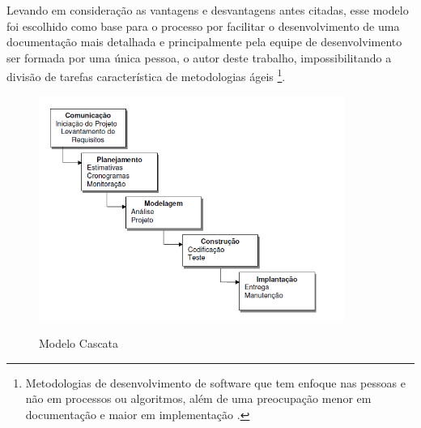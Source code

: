 Levando em consideração as vantagens e desvantagens antes citadas, esse modelo foi escolhido como base para o processo por facilitar o desenvolvimento de uma documentação mais detalhada e 
principalmente pela equipe de desenvolvimento ser formada por uma única pessoa, o autor deste trabalho, impossibilitando a divisão de tarefas característica de metodologias 
ágeis \footnote{Metodologias de desenvolvimento de software que tem enfoque nas pessoas e não em processos ou algoritmos, além de uma preocupação menor em documentação e maior em implementação 
\cite{michel2004metodologias}.}.

\begin{figure}[H]
\centering
\caption{Modelo Cascata}
\includegraphics[width=10cm]{figuras/figura_ciclo_cascata}
\label{figura_ciclo_cascata}
\end{figure}

